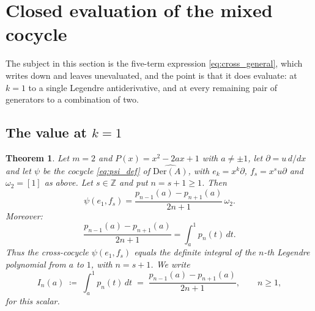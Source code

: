 \documentclass[11pt]{amsart}
\newtheorem{theorem}{Theorem}[section]
\theoremstyle{definition}
\theoremstyle{remark}
\newcommand{\Z}{\mathbb{Z}}
\newcommand{\Der}{\mathrm{Der}}
\newcommand{\pa}{\partial}
\newcommand{\hDer}{\widehat{\Der(A)}}
\begin{document}
\section{Closed evaluation of the mixed cocycle}
\label{sec:cross}

The subject in this section is the five-term expression
\eqref{eq:cross_general}, which \cite{CoxZhao2018} writes down and leaves
unevaluated, and the point is that it does evaluate: at $k=1$ to a single
Legendre antiderivative, and at every remaining pair of generators to a
combination of two.

\subsection{The value at $k=1$}

\begin{theorem}\label{thm:antiderivative}
Let $m=2$ and $P(x)=x^2-2ax+1$ with $a\neq\pm1$, let $\pa=u\,d/dx$ and let
$\psi$ be the cocycle \eqref{eq:psi_def} of $\hDer$, with $e_k=x^k\pa$,
$f_s=x^su\pa$ and $\omega_2=[1]$ as above. Let $s\in\Z$ and put
$n=s+1\geq1$. Then
\begin{equation}\label{eq:antideriv}
  \psi(e_1,f_s) = \frac{p_{n-1}(a)-p_{n+1}(a)}{2n+1}\,\omega_2.
\end{equation}
Moreover:
\begin{equation}\label{eq:antideriv_integral}
  \frac{p_{n-1}(a)-p_{n+1}(a)}{2n+1} = \int_a^1 p_n(t)\,dt.
\end{equation}
Thus the cross-cocycle $\psi(e_1,f_s)$ equals the definite integral
of the $n$-th Legendre polynomial from $a$ to $1$, with
$n=s+1$. We write
\begin{equation}\label{eq:In}
  I_n(a)\;\coloneqq\;\int_a^1p_n(t)\,dt\;=\;\frac{p_{n-1}(a)-p_{n+1}(a)}{2n+1},
  \qquad n\geq1 ,
\end{equation}
for this scalar.
\end{theorem}
\end{document}
